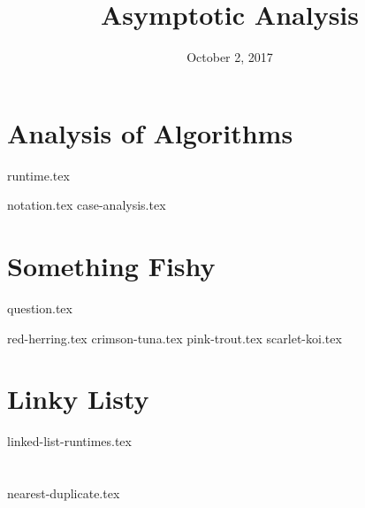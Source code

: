 \documentclass[11pt]{exam}
\title{Asymptotic Analysis}
\date{October 2, 2017}
\begin{document}
\maketitle

\section{Analysis of Algorithms}
{runtime.tex}
\begin{questions}
{notation.tex}
{case-analysis.tex}
\end{questions}

\section{Something Fishy}
{question.tex}
\begin{questions}
{red-herring.tex}
{crimson-tuna.tex}
{pink-trout.tex}
{scarlet-koi.tex}
\end{questions}

\section{Linky Listy}
\begin{questions}
{linked-list-runtimes.tex}
\end{questions}

\section{}
\begin{questions}
{nearest-duplicate.tex}
\end{questions}
\end{document}
